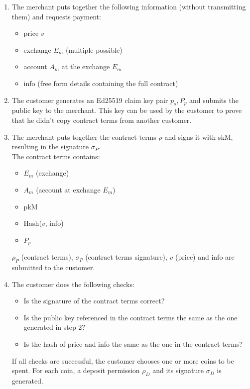 \begin{enumerate}
    \item The merchant puts together the following information (without transmitting them) and requests payment:
          \begin{itemize}
              \item price $ v $
              \item exchange $E_m$ (multiple possible)
              \item account $A_m$ at the exchange $E_m$
              \item info (free form details containing the full contract)
          \end{itemize}
    \item The customer generates an Ed25519 claim key pair $ p_s, P_p $ and submits the public key to the merchant.
          This key can be used by the customer to prove that he didn't copy contract terms from another customer.
    \item The merchant puts together the contract terms $ \rho  $ and signs it with skM, resulting in the signature $ \sigma_P$.
          \\The contract terms contains:
          \begin{itemize}
              \item $E_m$ (exchange)
              \item $A_m$ (account at exchange $E_m$)
              \item pkM
              \item Hash($v$, info)
              \item $ P_p $
          \end{itemize}
          $ \rho_P $ (contract terms), $ \sigma_P$ (contract terms signature), $ v $ (price) and info are submitted to the customer.
    \item The customer does the following checks:
          \begin{itemize}
              \item Is the signature of the contract terms correct?
              \item Is the public key referenced in the contract terms the same as the one generated in step 2?
              \item Is the hash of price and info the same as the one in the contract terms?
          \end{itemize}
          If all checks are successful, the customer chooses one or more coins to be spent.
          For each coin, a deposit permission $ \rho_{D} $ and its signature $ \sigma_{D} $ is generated.

\end{enumerate}

